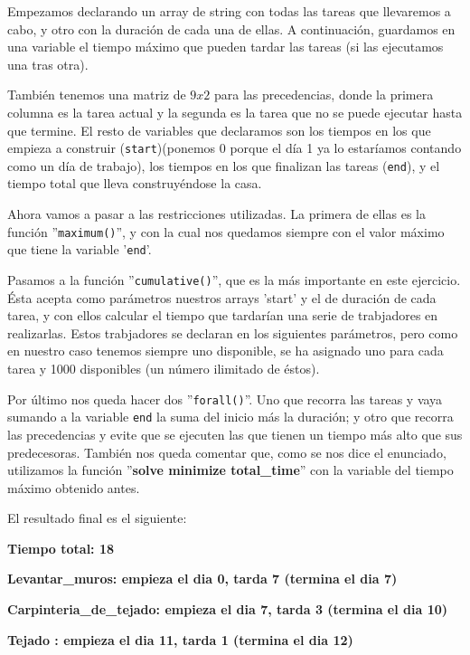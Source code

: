 \documentclass[11pt,a4paper]{article}
\begin{document}
Empezamos declarando un array de string con todas las tareas que llevaremos a cabo, y otro con la duración de cada una de ellas. A continuación,
guardamos en una variable el tiempo máximo que pueden tardar las tareas (si las ejecutamos una tras otra).

También tenemos una matriz de $9x2$ para las precedencias, donde la primera columna es la tarea actual y la segunda es la tarea que no se puede
ejecutar hasta que termine. El resto de variables que declaramos son los tiempos en los que empieza a construir (\texttt{start})(ponemos 0
porque el día 1 ya lo estaríamos contando como un día de trabajo), los tiempos en los que finalizan las tareas (\texttt{end}), y el tiempo total
que lleva construyéndose la casa.

Ahora vamos a pasar a las restricciones utilizadas. La primera de ellas es la función ''\texttt{maximum()}'', y con la cual nos quedamos siempre
con el valor máximo que tiene la variable '\texttt{end}'.

Pasamos a la función ''\texttt{cumulative()}'', que es la más importante en este ejercicio. Ésta acepta como parámetros nuestros arrays 'start'
y el de duración de cada tarea, y con ellos calcular el tiempo que tardarían una serie de trabjadores en realizarlas. Estos trabjadores se
declaran en los siguientes parámetros, pero como en nuestro caso tenemos siempre uno disponible, se ha asignado uno para cada tarea y 1000
disponibles (un número ilimitado de éstos).

Por último nos queda hacer dos ''\texttt{forall()}''. Uno que recorra las tareas y vaya sumando a la variable \texttt{end} la suma del inicio
más la duración; y otro que recorra las precedencias y evite que se ejecuten las que tienen un tiempo más alto que sus predecesoras. También
nos queda comentar que, como se nos dice el enunciado, utilizamos la función ''\textbf{solve minimize total\_time}'' con la variable del tiempo
máximo obtenido antes.

El resultado final es el siguiente:

\textbf{Tiempo total: 18} \vspace{-8px}

\textbf{Levantar\_muros: empieza el dia 0, tarda 7 (termina el dia 7)} \vspace{-8px}

\textbf{Carpinteria\_de\_tejado: empieza el dia 7, tarda 3 (termina el dia 10)}\vspace{-8px}

\textbf{Tejado : empieza el dia 11, tarda 1 (termina el dia 12)} \vspace{-8px}
\end{document}
